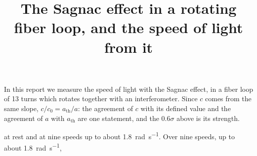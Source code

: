 %
%


\title{The Sagnac effect in a rotating fiber loop, and the speed of light from it}
%
In this report we measure the speed of light with the Sagnac effect, in a fiber loop of 13 turns which rotates together with an interferometer.
Since $c$ comes from the same slope, $c/c_0 = a_\mathrm{th}/a$: the agreement of $c$ with its defined value and the agreement of $a$ with $a_\mathrm{th}$ are one statement, and the $0.6\sigma$ above is its strength.


at rest and at nine speeds up to about \qty{1.8}{\radian\per\second}.
Over nine speeds, up to about \qty{1.8}{\radian\per\second},


